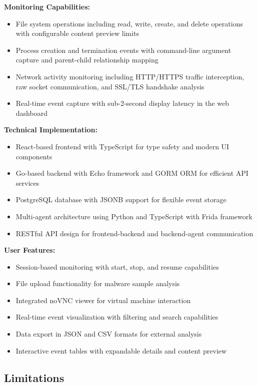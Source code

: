 \textbf{Monitoring Capabilities:}
\begin{itemize}
    \item File system operations including read, write, create, and delete operations with configurable content preview limits
    \item Process creation and termination events with command-line argument capture and parent-child relationship mapping
    \item Network activity monitoring including HTTP/HTTPS traffic interception, raw socket communication, and SSL/TLS handshake analysis
    \item Real-time event capture with sub-2-second display latency in the web dashboard
\end{itemize}

\textbf{Technical Implementation:}
\begin{itemize}
    \item React-based frontend with TypeScript for type safety and modern UI components
    \item Go-based backend with Echo framework and GORM ORM for efficient API services
    \item PostgreSQL database with JSONB support for flexible event storage
    \item Multi-agent architecture using Python and TypeScript with Frida framework
    \item RESTful API design for frontend-backend and backend-agent communication
\end{itemize}

\textbf{User Features:}
\begin{itemize}
    \item Session-based monitoring with start, stop, and resume capabilities
    \item File upload functionality for malware sample analysis
    \item Integrated noVNC viewer for virtual machine interaction
    \item Real-time event visualization with filtering and search capabilities
    \item Data export in JSON and CSV formats for external analysis
    \item Interactive event tables with expandable details and content preview
\end{itemize}

\subsection*{Limitations}

